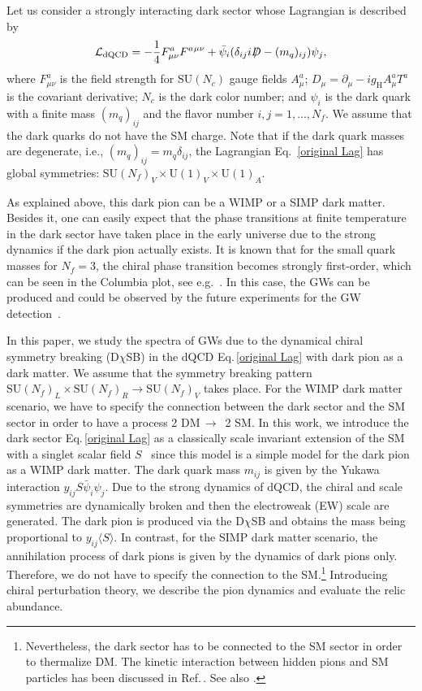 \documentclass[a4paper,preprint,superscriptaddress,preprintnumbers,nofootinbib]{revtex4}
\newcommand{\Slash}[1]{{\ooalign{\hfil/\hfil\crcr$#1$}}}
\newcommand{\SU}{\text{SU}}
\newcommand{\al}[1]{\begin{align}#1\end{align}}
\newcommand{\p}{\partial}
\newcommand{\fn}[1]{\!\left(#1\right)}
\newcommand{\bra}{\langle}
\newcommand{\ket}{\rangle}
\newcommand{\Lag}{\mathcal L}
\begin{document}
Let us consider a strongly interacting dark sector whose Lagrangian is described by
\al{
\Lag_\text{dQCD}=-\frac{1}{4}F_{\mu\nu}^aF^a{}^{\mu\nu} + \bar \psi_i (\delta _{ij}i\Slash D - (m_q)_{ij}) \psi_j,
\label{original Lag}
}
where $F_{\mu\nu}^a$ is the field strength for $\SU\fn{N_c}$ gauge fields $A_\mu^a$; $D_\mu=\p_\mu-ig_\text{H}A_\mu^aT^a$ is the covariant derivative; $N_c$ is the dark color number; and $\psi_i$ is the dark quark with a finite mass $(m_q)_{ij}$ and the flavor number $i,j=1,...,N_f$.
We assume that the dark quarks do not have the SM charge.
Note that if the dark quark masses are degenerate, i.e., $(m_q)_{ij}=m_q\delta_{ij}$, the Lagrangian Eq.~\eqref{original Lag} has global symmetries: $\text{SU}\fn{N_f}_{V}\times \text{U}\fn{1}_V\times \text{U}\fn{1}_A$.


As explained above, this dark pion can be a WIMP or a SIMP dark matter.
Besides it, one can easily expect that the phase transitions at finite temperature in the dark sector have taken place in the early universe due to the strong dynamics if the dark pion actually exists.
It is known that for the small quark masses for $N_f=3$, the chiral phase transition becomes strongly first-order, which can be seen in the Columbia plot, see e.g.~\cite{Brown:1990ev}.
In this case, the GWs can be produced and could be observed by the future experiments for the GW detection~\cite{Schwaller:2015tja}.

In this paper, we study the spectra of GWs due to the dynamical chiral symmetry breaking (D$\chi$SB) in the dQCD Eq.\,\eqref{original Lag} with dark pion as a dark matter.
We assume that the symmetry breaking pattern $\text{SU}\fn{N_f}_L \times \text{SU}\fn{N_f}_R \to \text{SU}\fn{N_f}_V$ takes place.
For the WIMP dark matter scenario, we have to specify the connection between the dark sector and the SM sector in order to have a process 2 DM\,$\to$\, 2 SM.
In this work, we introduce the dark sector Eq.\,\eqref{original Lag} as a classically scale invariant extension of the SM with a singlet scalar field $S$~\cite{Hur:2007uz,Hur:2011sv,Heikinheimo:2013fta,Farzinnia:2013pga,Foot:2013hna,Holthausen:2013ota,Kubo:2014ida,Ametani:2015jla} since this model is a simple model for the dark pion as a WIMP dark matter. 
The dark quark mass $m_{ij}$ is given by the Yukawa interaction $y_{ij}S\bar \psi_i\psi_j$.
Due to the strong dynamics of dQCD, the chiral and scale symmetries are dynamically broken and then the electroweak (EW) scale are generated.
The dark pion is produced via the D$\chi$SB and obtains the mass being proportional to $y_{ij}\bra S\ket$.
In contrast, for the SIMP dark matter scenario, the annihilation process of dark pions is given by the dynamics of dark pions only.
Therefore, we do not have to specify the connection to the SM.\footnote{Nevertheless, the dark sector has to be connected to the SM sector in order to thermalize DM.
The kinetic interaction between hidden pions and SM particles has been discussed in Ref.\,\cite{Kamada:2016ois}.
See also \cite{Bernal:2015ova}.
}
Introducing chiral perturbation theory, we describe the pion dynamics and evaluate the relic abundance. 
\end{document}
